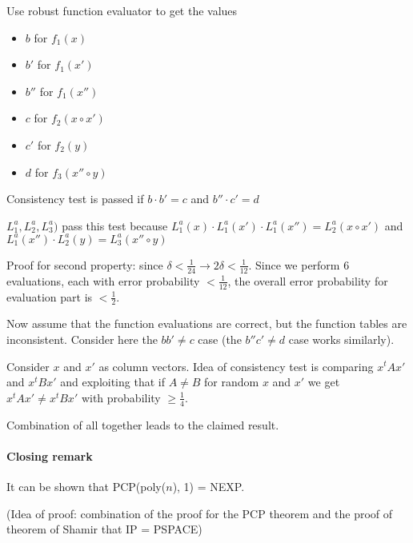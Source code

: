 \documentclass[11pt]{article}
\theoremstyle{definition}
\theoremstyle{definition}
\begin{document}
Use robust function evaluator to get the values
\begin{itemize}
\item $ b $ for $ f_1(x) $
\item $ b' $ for $ f_1(x') $
\item $ b'' $ for $ f_1(x'') $
\item $ c $ for $ f_2(x \circ x') $
\item $ c' $ for $ f_2(y) $
\item $ d $ for $ f_3(x'' \circ y) $
\end{itemize}

Consistency test is passed if $ b \cdot b' = c$ and $ b'' \cdot c' = d $

$ L_1^a, L_2^a, L_3^a )$ pass this test because $ L_1^a(x) \cdot L_1^a(x') \cdot L_1^a(x'') = L_2^a(x \circ x') $ and $ L_1^a(x'') \cdot L_2^a(y) = L_3^a(x'' \circ y) $

Proof for second property: since $ \delta < \frac{1}{24} \rightarrow 2\delta < \frac{1}{12} $. Since we perform 6 evaluations, each with error probability $ < \frac{1}{12} $, the overall error probability for evaluation part is $ < \frac{1}{2} $.

Now assume that the function evaluations are correct, but the function tables are inconsistent. Consider here the $ b b' \neq c $ case (the $ b'' c' \neq d $ case works similarly).

Consider $ x $ and $ x' $ as column vectors. Idea of consistency test is comparing $ x^t A x' $ and $ x^t B x' $ and exploiting that if $ A \neq B $ for random $ x $ and $ x' $ we get $ x^t A x' \neq x^t B x' $ with probability $ \geq \frac{1}{4} $. \bigskip

Combination of all together leads to the claimed result.

\paragraph{Closing remark}
It can be shown that PCP(poly($n$), 1) = NEXP.

(Idea of proof: combination of the proof for the PCP theorem and the proof of theorem of Shamir that IP = PSPACE)
\end{document}
